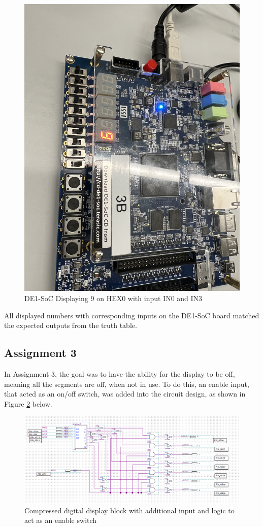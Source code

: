 \documentclass[
	letterpaper, %
	10pt, %
]{CSUniSchoolLabReport}
\begin{document}
\begin{figure}[H]
  \centering
  \includegraphics[width=.9\textwidth]{Figures/Disp_9.jpg}
  \caption{DE1-SoC Displaying 9 on HEX0 with input IN0 and IN3}
  \label{fig:12}
\end{figure}

\hspace{.5 in} All displayed numbers with corresponding inputs on the DE1-SoC board matched the expected outputs from the truth table. 

\subsection{Assignment 3}

\hspace{.5 in} In Assignment 3, the goal was to have the ability for the display to be off, meaning all the segments are off, when not in use. To do this, an enable input, that acted as an on/off switch, was added into the circuit design, as shown in Figure \ref{fig:13} below.

\begin{figure}[H]
  \centering
  \includegraphics[width=.9\textwidth]{Figures/Design_en.png}
  \caption{Compressed digital display block with additional input and logic to act as an enable switch}
  \label{fig:13}
\end{figure}
\end{document}
